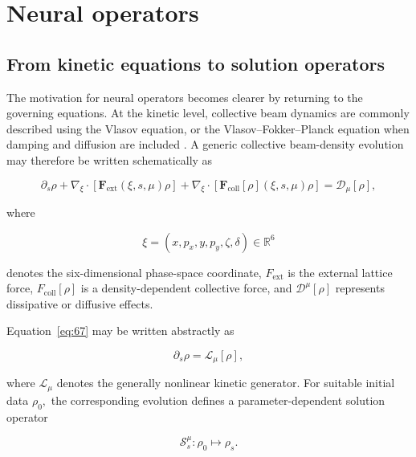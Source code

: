 \section{Neural operators}
\label{sec:04_machine_learning_methodology_neural_operators}

\subsection{From kinetic equations to solution operators}
\label{sec:04_machine_learning_methodology_from_kinetic_equations_to_solution_operators}

The motivation for neural operators becomes clearer by returning to the governing equations. At the kinetic level, collective beam dynamics are commonly described using the Vlasov equation, or the Vlasov–Fokker–Planck equation when damping and diffusion are included \cite{wiedemann2015vlasov,metral2022mitigation,schoenfeldt2017vfp}. A generic collective beam-density evolution may therefore be written schematically as

\begin{equation}
\label{eq:67}
\partial_s\rho+\nabla_{\xi}\cdot[\mathbf F_{\mathrm{ext}}(\xi,s,\mu)\rho]+\nabla_{\xi}\cdot[\mathbf F_{\mathrm{coll}}[\rho](\xi,s,\mu)\rho]=\mathcal D_{\mu}[\rho],
\end{equation}

where

\begin{equation}
\label{eq:68}
\xi=(x,p_x,y,p_y,\zeta,\delta)\in\mathbb R^6
\end{equation}

denotes the six-dimensional phase-space coordinate, \(F_{\mathrm{ext}}\) is the external lattice force, \(F_{\mathrm{coll}} [ \rho ]\) is a density-dependent collective force, and \(\mathcal{D}^{\mu} [ \rho ]\) represents dissipative or diffusive effects.

Equation~\eqref{eq:67} may be written abstractly as

\begin{equation}
\label{eq:69}
\partial_s\rho=\mathcal L_{\mu}[\rho],
\end{equation}

where \(\mathcal{L}_{\mu}\) denotes the generally nonlinear kinetic generator. For suitable initial data \(\rho_{0} ,\) the corresponding evolution defines a parameter-dependent solution operator

\begin{equation}
\label{eq:70}
\mathcal S_s^{\mu}:\rho_0\longmapsto\rho_s.
\end{equation}

